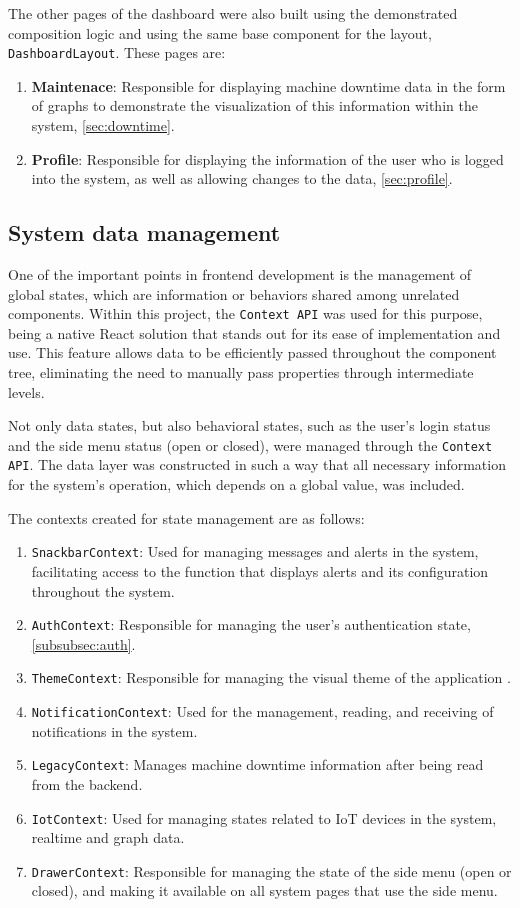 The other pages of the dashboard were also built using the demonstrated composition logic and using the same base component for the layout, \texttt{DashboardLayout}. These pages are:
\begin{enumerate}
    \item \textbf{Maintenace}: Responsible for displaying machine downtime data in the form of graphs to demonstrate the visualization of this information within the system, \ref{sec:downtime}.
    \item \textbf{Profile}: Responsible for displaying the information of the user who is logged into the system, as well as allowing changes to the data, \ref{sec:profile}.
\end{enumerate}


\subsection{System data management}\label{subsec:contextApi}
One of the important points in frontend development is the management of global states, which are information or behaviors shared among unrelated components. Within this project, the \texttt{Context API} \cite{reactCreateContext} was used for this purpose, being a native React solution that stands out for its ease of implementation and use. This feature allows data to be efficiently passed throughout the component tree, eliminating the need to manually pass properties through intermediate levels.

Not only data states, but also behavioral states, such as the user's login status and the side menu status (open or closed), were managed through the \texttt{Context API}. The data layer was constructed in such a way that all necessary information for the system's operation, which depends on a global value, was included.

The contexts created for state management are as follows:
\begin{enumerate}
    \item \texttt{SnackbarContext}: Used for managing messages and alerts in the system, facilitating access to the function that displays alerts and its configuration throughout the system.
    \item \texttt{AuthContext}: Responsible for managing the user's authentication state, \ref{subsubsec:auth}.
    \item \texttt{ThemeContext}: Responsible for managing the visual theme of the application \cite{muiDefaultTheme}.
    \item \texttt{NotificationContext}: Used for the management, reading, and receiving of notifications in the system.
    \item \texttt{LegacyContext}: Manages machine downtime information after being read from the backend.
    \item \texttt{IotContext}: Used for managing states related to IoT devices in the system, realtime and graph data.
    \item \texttt{DrawerContext}: Responsible for managing the state of the side menu (open or closed), and making it available on all system pages that use the side menu.
\end{enumerate}

